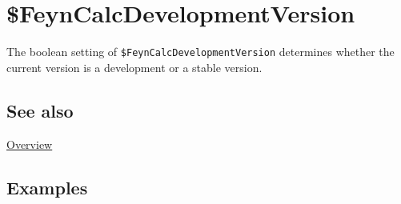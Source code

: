 \documentclass[../FeynCalcManual.tex]{subfiles}
\begin{document}
\hypertarget{dollarfeyncalcdevelopmentversion}{
\section{\$FeynCalcDevelopmentVersion}\label{dollarfeyncalcdevelopmentversion}}

The boolean setting of \texttt{\$FeynCalcDevelopmentVersion} determines
whether the current version is a development or a stable version.

\subsection{See also}

\hyperlink{toc}{Overview}

\subsection{Examples}
\end{document}
